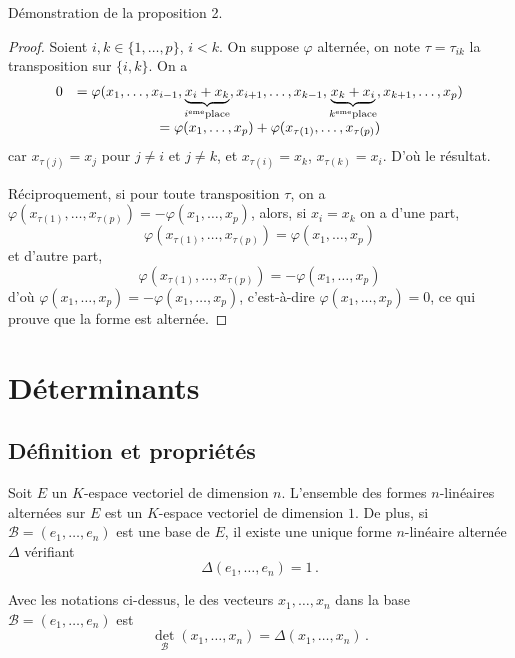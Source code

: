 \documentclass[class=report,crop=false]{standalone}
\begin{document}
Démonstration de la proposition 2.
\begin{proof}
Soient $i,k\in\{1,\dots,p\}$, $i<k$. On suppose $\varphi$ alternée, on note $\tau=\tau_{ik}$ la transposition sur $\{i,k\}$. On a
$$\begin{array}{cc}0&=\varphi(x_1,\dots,x_{i-1},\underbrace{x_i+x_k}_{i^{\rm{eme}}{\rm place}},x_{i+1},\dots,x_{k-1},\underbrace{x_k+x_i}_{k^{\rm{eme}}{\rm place}},x_{k+1},\dots,x_p)\cr
&=\varphi(x_1,\dots,x_p)+
\varphi(x_{\tau(1)},\dots,x_{\tau(p)})\end{array}$$
car $x_{\tau(j)}=x_j$ pour $j\neq i $ et $j\neq k$, et $x_{\tau(i)}=x_k$, $x_{\tau(k)}=x_i$.
D'où le résultat.

Réciproquement, si pour toute transposition $\tau$, on a
$\varphi(x_{\tau(1)},\dots,x_{\tau(p)})=-\varphi(x_1,\dots,x_p)$, alors, si $x_i=x_k$ on a
d'une part,
$$\varphi(x_{\tau(1)},\dots,x_{\tau(p)})=\varphi(x_1,\dots,x_p)$$ et d'autre part,
$$\varphi(x_{\tau(1)},\dots,x_{\tau(p)})=-\varphi(x_1,\dots,x_p)$$
d'où $\varphi(x_1,\dots,x_p)=-\varphi(x_1,\dots,x_p)$, c'est-à-dire $\varphi(x_1,\dots,x_p)=0$,
ce qui prouve que la forme est alternée.  
\end{proof}







\section{Déterminants}

\subsection{Définition et propriétés}


\begin{theoreme}
Soit $E$ un $K$-espace vectoriel de dimension $n$. L'ensemble des formes $n$-linéaires
alternées sur $E$ est un $K$-espace vectoriel de dimension $1$. De plus, si $\mathcal{B}=(e_1,\dots,e_n)$ est une base de $E$, il
existe une unique forme $n$-linéaire alternée $\Delta$ vérifiant
$$\Delta(e_1,\dots,e_n)=1\,.$$
\end{theoreme} 

\begin{definition}
Avec les notations ci-dessus, le  des vecteurs $x_1,\dots,x_n$ dans la base 
$\mathcal{B}=(e_1,\dots,e_n)$ est
$${\det}_{\mathcal{B}}(x_1,\dots,x_n)=\Delta(x_1,\dots,x_n)\,.$$
\end{definition} 
\end{document}
